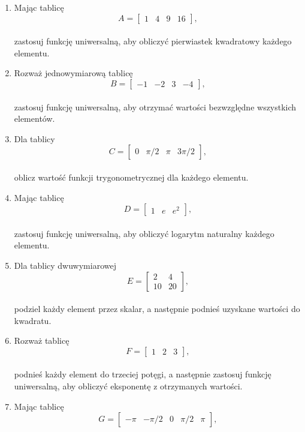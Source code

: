 \documentclass[
  polish,
  letterpaper,
  DIV=11,
  numbers=noendperiod]{scrreprt}
\begin{document}
\begin{enumerate}
\def\labelenumi{\arabic{enumi}.}
\item
  Mając tablicę\\
  \[A = \begin{bmatrix}1 & 4 & 9 & 16\end{bmatrix},\]\\
  zastosuj funkcję uniwersalną, aby obliczyć pierwiastek kwadratowy
  każdego elementu.
\item
  Rozważ jednowymiarową tablicę\\
  \[B = \begin{bmatrix}-1 & -2 & 3 & -4\end{bmatrix},\]\\
  zastosuj funkcję uniwersalną, aby otrzymać wartości bezwzględne
  wszystkich elementów.
\item
  Dla tablicy\\
  \[C = \begin{bmatrix}0 & \pi/2 & \pi & 3\pi/2\end{bmatrix},\]\\
  oblicz wartość funkcji trygonometrycznej dla każdego elementu.
\item
  Mając tablicę\\
  \[D = \begin{bmatrix}1 & e & e^2 \end{bmatrix},\]\\
  zastosuj funkcję uniwersalną, aby obliczyć logarytm naturalny każdego
  elementu.
\item
  Dla tablicy dwuwymiarowej\\
  \[E = \begin{bmatrix}2 & 4 \\ 10 & 20 \end{bmatrix},\]\\
  podziel każdy element przez skalar, a następnie podnieś uzyskane
  wartości do kwadratu.
\item
  Rozważ tablicę\\
  \[F = \begin{bmatrix}1 & 2 & 3\end{bmatrix},\]\\
  podnieś każdy element do trzeciej potęgi, a następnie zastosuj funkcję
  uniwersalną, aby obliczyć eksponentę z otrzymanych wartości.
\item
  Mając tablicę\\
  \[G = \begin{bmatrix}-\pi & -\pi/2 & 0 & \pi/2 & \pi\end{bmatrix},\]\\

\end{enumerate}
\end{document}
